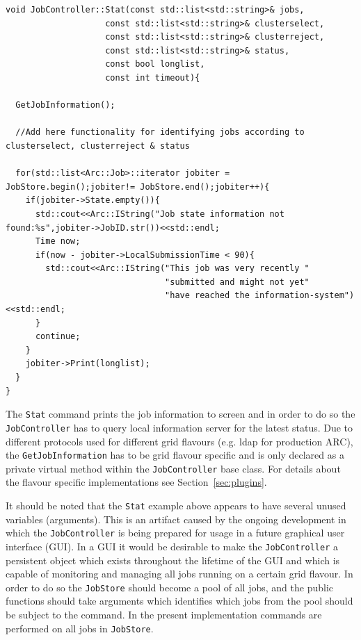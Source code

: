 \documentclass{book}
\newcommand{\JobController}{\texttt{JobController}}
\begin{document}
\begin{shaded}
\begin{small}
\begin{verbatim}
void JobController::Stat(const std::list<std::string>& jobs,
                    const std::list<std::string>& clusterselect,
                    const std::list<std::string>& clusterreject,
                    const std::list<std::string>& status,
                    const bool longlist,
                    const int timeout){
    
  GetJobInformation();

  //Add here functionality for identifying jobs according to clusterselect, clusterreject & status

  for(std::list<Arc::Job>::iterator jobiter = JobStore.begin();jobiter!= JobStore.end();jobiter++){
    if(jobiter->State.empty()){
      std::cout<<Arc::IString("Job state information not found:%s",jobiter->JobID.str())<<std::endl;
      Time now;
      if(now - jobiter->LocalSubmissionTime < 90){
        std::cout<<Arc::IString("This job was very recently "
                                "submitted and might not yet" 
                                "have reached the information-system")<<std::endl;
      }
      continue;
    }
    jobiter->Print(longlist);
  }
}
\end{verbatim}
\end{small}
\end{shaded}

The \texttt{Stat} command prints the job information to screen and in order to do so the {\JobController} has to query local information
server for the latest status. Due to different protocols used for different grid flavours (e.g. ldap for production ARC), the 
\texttt{GetJobInformation} has to be grid flavour specific and is only declared as a private virtual method within the {\JobController}
base class. For details about the flavour specific implementations see Section~\ref{sec:plugins}.

It should be noted that the \texttt{Stat} example above appears to have several unused variables (arguments). This is an artifact 
caused by the ongoing development in which the {\JobController} is being prepared for usage in a future graphical user interface (GUI).
In a GUI it would be desirable to make the {\JobController} a persistent object which exists throughout the lifetime of the GUI and 
which is capable of monitoring and managing all jobs running on a certain grid flavour. In order to do so the \texttt{JobStore} should 
become a pool of all jobs, and the public functions should take arguments which identifies which jobs from the pool should be subject 
to the command. In the present implementation commands are performed on all jobs in \texttt{JobStore}.
\end{document}
